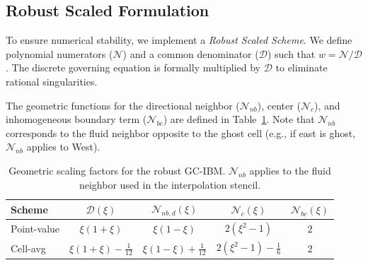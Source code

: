 \documentclass[preprint,12pt]{elsarticle}
\begin{document}
\subsection{Robust Scaled Formulation}

To ensure numerical stability, we implement a \textit{Robust Scaled Scheme}. We define polynomial numerators ($\mathcal{N}$) and a common denominator ($\mathcal{D}$) such that $w = \mathcal{N}/\mathcal{D}$. The discrete governing equation is formally multiplied by $\mathcal{D}$ to eliminate rational singularities.

The geometric functions for the directional neighbor ($\mathcal{N}_{nb}$), center ($\mathcal{N}_c$), and inhomogeneous boundary term ($\mathcal{N}_{bc}$) are defined in Table~\ref{tab:ibm_coeffs}. Note that $\mathcal{N}_{nb}$ corresponds to the fluid neighbor opposite to the ghost cell (e.g., if east is ghost, $\mathcal{N}_{nb}$ applies to West).

\begin{table}[h!]
    \centering
    \renewcommand{\arraystretch}{1.5}
    \begin{tabular}{|l|c|c|c|c|}
        \hline
        \textbf{Scheme} & $\mathcal{D}(\xi)$ & $\mathcal{N}_{nb,d}(\xi)$ &
        $\mathcal{N}_c(\xi)$ &
        $\mathcal{N}_{bc}(\xi)$ \\
        \hline
        Point-value & $\xi(1+\xi)$ & $\xi(1-\xi)$ & $2(\xi^2 - 1)$ & $2$ \\
        \hline
        Cell-avg & $\xi(1+\xi) - \frac{1}{12}$ & $\xi(1-\xi) + \frac{1}{12}$ & $2(\xi^2 - 1) - \frac{1}{6}$ & $2$ \\
        \hline
    \end{tabular}
    \caption{Geometric scaling factors for the robust GC-IBM. $\mathcal{N}_{nb}$ applies to the fluid neighbor used in the interpolation stencil.}
    \label{tab:ibm_coeffs}
\end{table}
\end{document}
